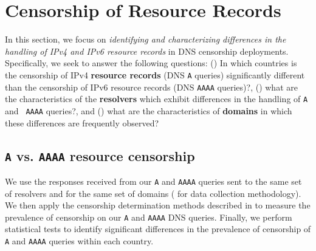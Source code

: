 \section{Censorship of Resource Records} \label{sec:resources}

In this section, we focus on {\it identifying and characterizing differences in
the handling of IPv4 and IPv6 resource records} in DNS censorship deployments.
Specifically, we seek to answer the following questions: 
%
() In which countries is the censorship of IPv4
\textbf{resource records} (DNS {\tt A} queries) significantly different than the
censorship of IPv6 resource records (DNS {\tt AAAA} queries)?,
%
() what are the characteristics of the
\textbf{resolvers} which exhibit differences in the handling of {\tt A} and {\tt
AAAA} queries?, and 
%
() what are the characteristics of \textbf{domains}
in which these differences are frequently observed?
%

\subsection{{\tt A} vs. {\tt AAAA} resource censorship} \label{sec:resources:country}
%
We use the responses received from our {\tt A} and {\tt AAAA} queries sent to
the same set of resolvers and for the same set of domains (\cf
{} for data collection methodology). We then apply the
censorship determination methods described in 
to measure the prevalence of censorship on our {\tt A} and {\tt AAAA} DNS
queries. Finally, we perform statistical tests to identify significant
differences in the prevalence of censorship of {\tt A} and {\tt AAAA} queries
within each country.

